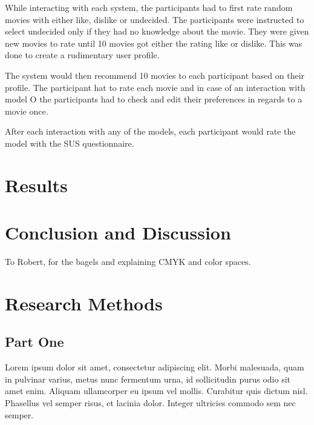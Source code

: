 \documentclass[sigconf]{acmart}
\begin{document}
While interacting with each system, the participants had to first rate random movies with either like, dislike or undecided. The participants were instructed to select undecided only if they had no knowledge about the movie. They were given new movies to rate until 10 movies got either the rating like or dislike. This was done to create a rudimentary user profile. 

The system would then recommend 10 movies to each participant based on their profile. The participant hat to rate each movie and in case of an interaction with model O the participants had to check and edit their preferences in regards to a movie once.

After each interaction with any of the models, each participant would rate the model with the SUS questionnaire.

\section{Results}

\section{Conclusion and Discussion}

\begin{acks}
To Robert, for the bagels and explaining CMYK and color spaces.
\end{acks}





\appendix

\section{Research Methods}

\subsection{Part One}

Lorem ipsum dolor sit amet, consectetur adipiscing elit. Morbi
malesuada, quam in pulvinar varius, metus nunc fermentum urna, id
sollicitudin purus odio sit amet enim. Aliquam ullamcorper eu ipsum
vel mollis. Curabitur quis dictum nisl. Phasellus vel semper risus, et
lacinia dolor. Integer ultricies commodo sem nec semper.
\end{document}
